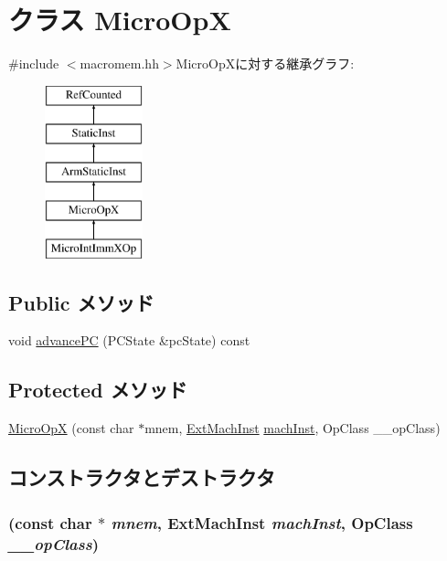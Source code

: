 \hypertarget{classArmISA_1_1MicroOpX}{
\section{クラス MicroOpX}
\label{classArmISA_1_1MicroOpX}
}


{\ttfamily \#include $<$macromem.hh$>$}MicroOpXに対する継承グラフ:\begin{figure}[H]
\begin{center}
\leavevmode
\includegraphics[height=5cm]{classArmISA_1_1MicroOpX}
\end{center}
\end{figure}
\subsection*{Public メソッド}
\begin{DoxyCompactItemize}
\item 
void \hyperlink{classArmISA_1_1MicroOpX_af04cd01429462d48e635f3e01ced6257}{advancePC} (PCState \&pcState) const 
\end{DoxyCompactItemize}
\subsection*{Protected メソッド}
\begin{DoxyCompactItemize}
\item 
\hyperlink{classArmISA_1_1MicroOpX_af06653f85c4862ab6db35679371186b6}{MicroOpX} (const char $\ast$mnem, \hyperlink{classStaticInst_a5605d4fc727eae9e595325c90c0ec108}{ExtMachInst} \hyperlink{classStaticInst_a744598b194ca3d4201d9414ce4cc4af4}{machInst}, OpClass \_\-\_\-opClass)
\end{DoxyCompactItemize}


\subsection{コンストラクタとデストラクタ}
\hypertarget{classArmISA_1_1MicroOpX_af06653f85c4862ab6db35679371186b6}{
\subsubsection[{MicroOpX}]{ (const char $\ast$ {\em mnem}, \/  {\bf ExtMachInst} {\em machInst}, \/  OpClass {\em \_\-\_\-opClass})}}
\label{classArmISA_1_1MicroOpX_af06653f85c4862ab6db35679371186b6}




